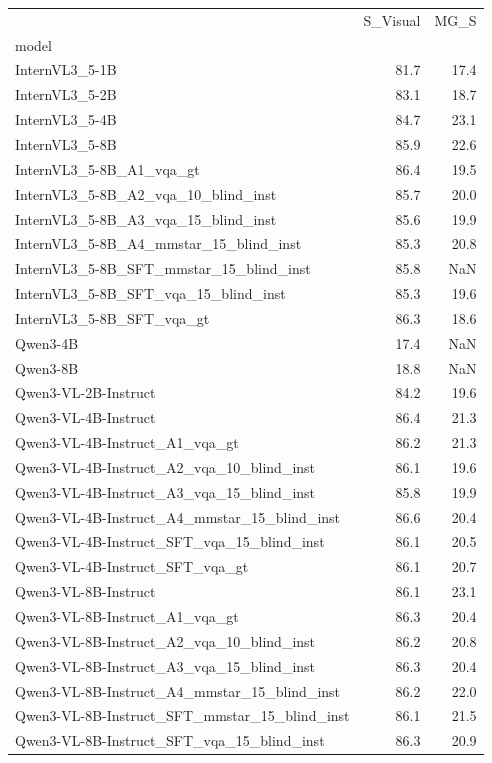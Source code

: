 \begin{tabular}{lrr}
\toprule
 & S_Visual & MG_S \\
model &  &  \\
\midrule
InternVL3_5-1B & 81.7 & 17.4 \\
InternVL3_5-2B & 83.1 & 18.7 \\
InternVL3_5-4B & 84.7 & 23.1 \\
InternVL3_5-8B & 85.9 & 22.6 \\
InternVL3_5-8B_A1_vqa_gt & 86.4 & 19.5 \\
InternVL3_5-8B_A2_vqa_10_blind_inst & 85.7 & 20.0 \\
InternVL3_5-8B_A3_vqa_15_blind_inst & 85.6 & 19.9 \\
InternVL3_5-8B_A4_mmstar_15_blind_inst & 85.3 & 20.8 \\
InternVL3_5-8B_SFT_mmstar_15_blind_inst & 85.8 & NaN \\
InternVL3_5-8B_SFT_vqa_15_blind_inst & 85.3 & 19.6 \\
InternVL3_5-8B_SFT_vqa_gt & 86.3 & 18.6 \\
Qwen3-4B & 17.4 & NaN \\
Qwen3-8B & 18.8 & NaN \\
Qwen3-VL-2B-Instruct & 84.2 & 19.6 \\
Qwen3-VL-4B-Instruct & 86.4 & 21.3 \\
Qwen3-VL-4B-Instruct_A1_vqa_gt & 86.2 & 21.3 \\
Qwen3-VL-4B-Instruct_A2_vqa_10_blind_inst & 86.1 & 19.6 \\
Qwen3-VL-4B-Instruct_A3_vqa_15_blind_inst & 85.8 & 19.9 \\
Qwen3-VL-4B-Instruct_A4_mmstar_15_blind_inst & 86.6 & 20.4 \\
Qwen3-VL-4B-Instruct_SFT_vqa_15_blind_inst & 86.1 & 20.5 \\
Qwen3-VL-4B-Instruct_SFT_vqa_gt & 86.1 & 20.7 \\
Qwen3-VL-8B-Instruct & 86.1 & 23.1 \\
Qwen3-VL-8B-Instruct_A1_vqa_gt & 86.3 & 20.4 \\
Qwen3-VL-8B-Instruct_A2_vqa_10_blind_inst & 86.2 & 20.8 \\
Qwen3-VL-8B-Instruct_A3_vqa_15_blind_inst & 86.3 & 20.4 \\
Qwen3-VL-8B-Instruct_A4_mmstar_15_blind_inst & 86.2 & 22.0 \\
Qwen3-VL-8B-Instruct_SFT_mmstar_15_blind_inst & 86.1 & 21.5 \\
Qwen3-VL-8B-Instruct_SFT_vqa_15_blind_inst & 86.3 & 20.9 \\

\end{tabular}
